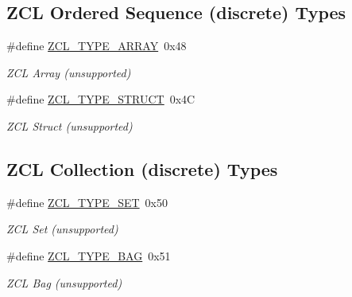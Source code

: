 \subsection*{Z\+CL Ordered Sequence (discrete) Types}
\begin{DoxyCompactItemize}
\item 
\mbox{\label{group__zcl__types_ga5f609d45e4eb91ae4187bf912e4f870b}} 
\#define \hyperlink{group__zcl__types_ga5f609d45e4eb91ae4187bf912e4f870b}{Z\+C\+L\+\_\+\+T\+Y\+P\+E\+\_\+\+A\+R\+R\+AY}~0x48
\begin{DoxyCompactList}\small\item\em Z\+CL Array (unsupported) \end{DoxyCompactList}\item 
\mbox{\label{group__zcl__types_ga2d94a79998fd3cdd13a2cd9ed25b88cb}} 
\#define \hyperlink{group__zcl__types_ga2d94a79998fd3cdd13a2cd9ed25b88cb}{Z\+C\+L\+\_\+\+T\+Y\+P\+E\+\_\+\+S\+T\+R\+U\+CT}~0x4C
\begin{DoxyCompactList}\small\item\em Z\+CL Struct (unsupported) \end{DoxyCompactList}\end{DoxyCompactItemize}
\subsection*{Z\+CL Collection (discrete) Types}
\begin{DoxyCompactItemize}
\item 
\mbox{\label{group__zcl__types_ga21ab004d25434d25e1e17865e895f1a7}} 
\#define \hyperlink{group__zcl__types_ga21ab004d25434d25e1e17865e895f1a7}{Z\+C\+L\+\_\+\+T\+Y\+P\+E\+\_\+\+S\+ET}~0x50
\begin{DoxyCompactList}\small\item\em Z\+CL Set (unsupported) \end{DoxyCompactList}\item 
\mbox{\label{group__zcl__types_gacd6bd1e469abc59bab04e247bc85997b}} 
\#define \hyperlink{group__zcl__types_gacd6bd1e469abc59bab04e247bc85997b}{Z\+C\+L\+\_\+\+T\+Y\+P\+E\+\_\+\+B\+AG}~0x51
\begin{DoxyCompactList}\small\item\em Z\+CL Bag (unsupported) \end{DoxyCompactList}\end{DoxyCompactItemize}
